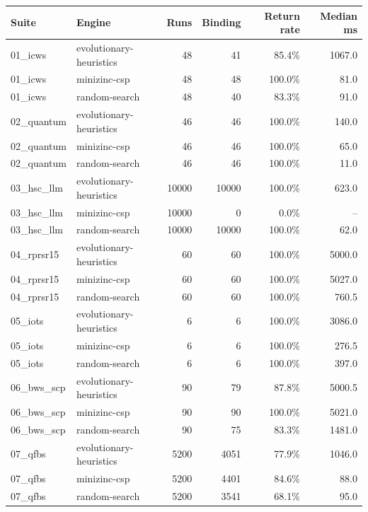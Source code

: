 \begin{tabular}{llrrrr}
\toprule
Suite & Engine & Runs & Binding & Return rate & Median ms \\
\midrule
01_icws & evolutionary-heuristics & 48 & 41 & 85.4\% & 1067.0 \\
01_icws & minizinc-csp & 48 & 48 & 100.0\% & 81.0 \\
01_icws & random-search & 48 & 40 & 83.3\% & 91.0 \\
02_quantum & evolutionary-heuristics & 46 & 46 & 100.0\% & 140.0 \\
02_quantum & minizinc-csp & 46 & 46 & 100.0\% & 65.0 \\
02_quantum & random-search & 46 & 46 & 100.0\% & 11.0 \\
03_hsc_llm & evolutionary-heuristics & 10000 & 10000 & 100.0\% & 623.0 \\
03_hsc_llm & minizinc-csp & 10000 & 0 & 0.0\% & -- \\
03_hsc_llm & random-search & 10000 & 10000 & 100.0\% & 62.0 \\
04_rprsr15 & evolutionary-heuristics & 60 & 60 & 100.0\% & 5000.0 \\
04_rprsr15 & minizinc-csp & 60 & 60 & 100.0\% & 5027.0 \\
04_rprsr15 & random-search & 60 & 60 & 100.0\% & 760.5 \\
05_iots & evolutionary-heuristics & 6 & 6 & 100.0\% & 3086.0 \\
05_iots & minizinc-csp & 6 & 6 & 100.0\% & 276.5 \\
05_iots & random-search & 6 & 6 & 100.0\% & 397.0 \\
06_bws_scp & evolutionary-heuristics & 90 & 79 & 87.8\% & 5000.5 \\
06_bws_scp & minizinc-csp & 90 & 90 & 100.0\% & 5021.0 \\
06_bws_scp & random-search & 90 & 75 & 83.3\% & 1481.0 \\
07_qfbs & evolutionary-heuristics & 5200 & 4051 & 77.9\% & 1046.0 \\
07_qfbs & minizinc-csp & 5200 & 4401 & 84.6\% & 88.0 \\
07_qfbs & random-search & 5200 & 3541 & 68.1\% & 95.0 \\
\bottomrule
\end{tabular}
